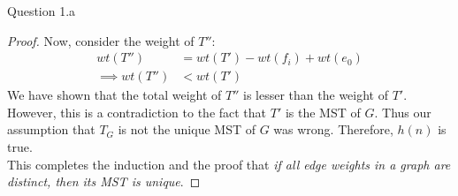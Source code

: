 \begin{solution}{Question 1.a}
\begin{proof}
        Now, consider the weight of $T''$:
        \begin{equation}
            \begin{split}
                wt(T'')&=wt(T')-wt(f_i)+wt(e_0)\\
                \implies wt(T'') &< wt(T')
            \end{split}
        \end{equation}
        We have shown that the total weight of $T''$ is lesser than the weight of $T'$. However, this is a contradiction to the fact that $T'$ is the MST of $G$. Thus our assumption that $T_G$ is not the unique MST of $G$ was wrong. Therefore, $h(n)$ is true.\\

        This completes the induction and the proof that \textit{if all edge weights in a graph are distinct, then its MST is unique}.
    \end{proof}
\end{solution}
